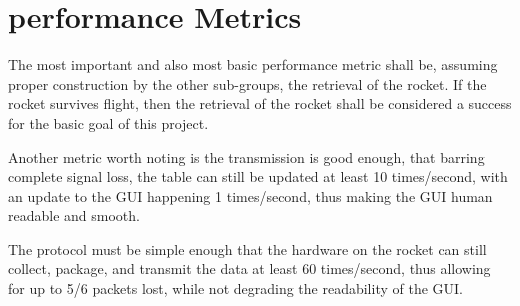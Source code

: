 \documentclass[onecolumn, draftclsnofoot,10pt, compsoc]{IEEEtran}
\begin{document}
\section{performance Metrics}
The most important and also most basic performance metric shall be, assuming proper construction by the other sub-groups, the retrieval of the rocket. If the rocket survives flight, then the retrieval of the rocket shall be considered a success for the basic goal of this project. \par 
Another metric worth noting is the transmission is good enough, that barring complete signal loss, the table can still be updated at least 10 times/second, with an update to the GUI happening 1 times/second, thus making the GUI human readable and smooth.\par
 The protocol must be simple enough that the hardware on the rocket can still collect, package, and transmit the data at least 60 times/second, thus allowing for up to 5/6 packets lost, while not degrading the readability of the GUI. \par
\end{document}
